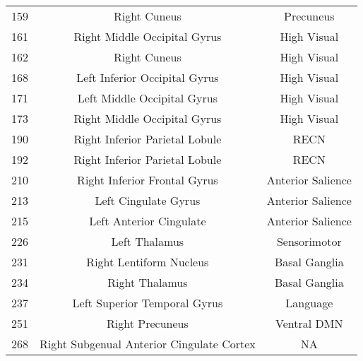 \documentclass[10pt,letterpaper]{article}\usepackage[]{graphicx}\usepackage[]{color}
\begin{document}
\begin{center}
\begin{longtable}[c]{ccc}
		159	& Right Cuneus & Precuneus \\
		161	& Right Middle Occipital Gyrus & High Visual \\
		162	& Right Cuneus & High Visual \\
		168	& Left Inferior Occipital Gyrus	& High Visual \\
		171	& Left Middle Occipital Gyrus & High Visual \\
		173	& Right Middle Occipital Gyrus & High Visual \\
		190	& Right Inferior Parietal Lobule & RECN \\
		192	& Right Inferior Parietal Lobule & RECN \\
		210	& Right Inferior Frontal Gyrus & Anterior Salience \\
		213	& Left Cingulate Gyrus & Anterior Salience \\
		215	& Left Anterior Cingulate & Anterior Salience \\
		226	& Left Thalamus	& Sensorimotor \\
		231	& Right Lentiform Nucleus & Basal Ganglia \\
		234	& Right Thalamus & Basal Ganglia \\
		237	& Left Superior Temporal Gyrus & Language \\
		251	& Right Precuneus & Ventral DMN \\
		268	& Right Subgenual Anterior Cingulate Cortex	& NA \\
	\end{longtable}
\end{center}
\end{document}
